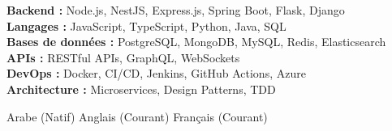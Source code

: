 \documentclass[11pt,a4paper]{article}
\begin{document}
{\small
\textbf{Backend :} Node.js, NestJS, Express.js, Spring Boot, Flask, Django\\[1.5pt]
\textbf{Langages :} JavaScript, TypeScript, Python, Java, SQL\\[1.5pt]
\textbf{Bases de données :} PostgreSQL, MongoDB, MySQL, Redis, Elasticsearch\\[1.5pt]
\textbf{APIs :} RESTful APIs, GraphQL, WebSockets\\[1.5pt]
\textbf{DevOps :} Docker, CI/CD, Jenkins, GitHub Actions, Azure\\[1.5pt]
\textbf{Architecture :} Microservices, Design Patterns, TDD
}

Arabe (Natif) \textbar{} Anglais (Courant) \textbar{} Français (Courant)

\end{document}
